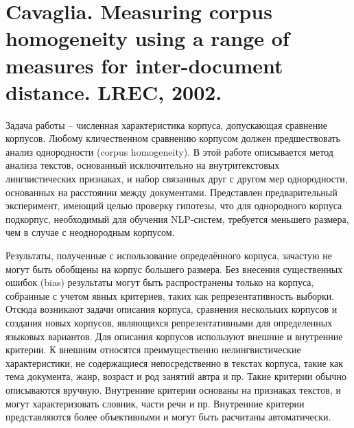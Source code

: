 


\section{Cavaglia. Measuring corpus homogeneity using a range of measures for inter-document distance. LREC, 2002.}

Задача работы -- численная характеристика корпуса, допускающая сравнение корпусов. Любому кличественном сравнению корпусом должен предшествовать анализ однородности (corpus homogeneity). В этой работе описывается метод анализа текстов, основанный исключительно на внутритекстовых лингвистических признаках, и набор связанных друг с другом мер однородности, основанных на расстоянии между документами. Представлен предварительный эксперимент, имеющий целью проверку гипотезы, что для однородного корпуса подкорпус, необходимый для обучения NLP-систем, требуется меньшего размера, чем в случае с неоднородным корпусом.

Результаты, полученные с использование определённого корпуса, зачастую не могут быть обобщены на корпус большего размера. Без внесения существенных ошибок (bias) результаты могут быть распространены только на корпуса, собранные с учетом явных критериев, таких как репрезентативность выборки. Отсюда возникают задачи описания корпуса, сравнения нескольких корпусов и создания новых корпусов, являющихся репрезентативными для определенных языковых вариантов. Для описания корпусов используют внешние и внутренние критерии. К внешним относятся преимущественно нелингвистические характеристики, не содержащиеся непосредственно в текстах корпуса, такие как тема документа, жанр, возраст и род занятий автра и пр. Такие критерии обычно описываются вручную. Внутренние критерии основаны на признаках текстов, и могут характеризовать словник, части речи и пр. Внутренние критерии представляются более объективными и могут быть расчитаны автоматически. 

